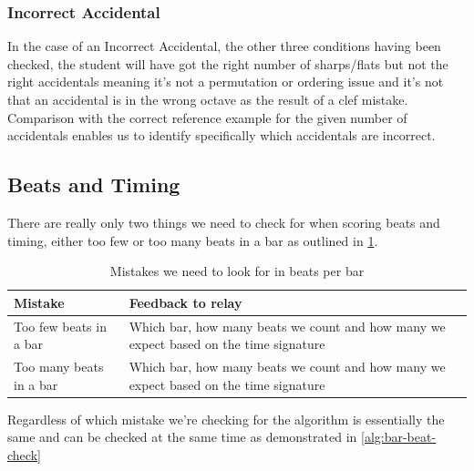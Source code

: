 \subsubsection{Incorrect Accidental}\label{sec:scoring-keysig-incorrect}

In the case of an Incorrect Accidental, the other three conditions having been checked, the student will have got the right number of sharps/flats but not the right accidentals meaning it's not a permutation or ordering issue and it's not that an accidental is in the wrong octave as the result of a clef mistake. Comparison with the correct reference example for the given number of accidentals enables us to identify specifically which accidentals are incorrect.

\subsection{Beats and Timing}\label{sec:scoring-beats}

There are really only two things we need to check for when scoring beats and timing, either too few or too many beats in a bar as outlined in \cref{table:bar-beat-errors}.

\begin{table}[H]
    \renewcommand{\arraystretch}{1.6}
    \begin{tabularx}{\textwidth}{ lX }
        \toprule
        Mistake & Feedback to relay \\
        \midrule
        Too few beats in a bar & Which bar, how many beats we count and how many we expect based on the time signature \\
        Too many beats in a bar & Which bar, how many beats we count and how many we expect based on the time signature \\
        \bottomrule
    \end{tabularx}

    \caption{Mistakes we need to look for in beats per bar}
    \label{table:bar-beat-errors}
\end{table}

Regardless of which mistake we're checking for the algorithm is essentially the same and can be checked at the same time as demonstrated in \cref{alg:bar-beat-check}

